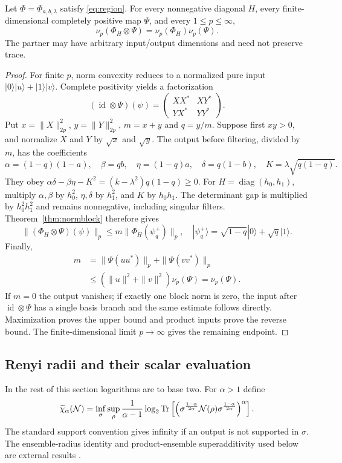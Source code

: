 \begin{theorem}\label{thm:filterednorm}
Let $\Phi=\Phi_{a,b,\lambda}$ satisfy \eqref{eq:region}. For every
nonnegative diagonal $H$, every finite-dimensional completely positive
map $\Psi$, and every $1\le p\le\infty$,
\[
 \nu_p(\Phi_H\otimes\Psi)=\nu_p(\Phi_H)\nu_p(\Psi).
\]
The partner may have arbitrary input/output dimensions and need not
preserve trace.
\end{theorem}
\begin{proof}
For finite $p$, norm convexity reduces to a normalized pure input
$|0\rangle|u\rangle+|1\rangle|v\rangle$. Complete positivity yields a
factorization
\[
 (\operatorname{id}\otimes\Psi)(\psi)
 =\begin{pmatrix}XX^*&XY^*\\YX^*&YY^*\end{pmatrix}.
\]
Put $x=\|X\|_{2p}^2$, $y=\|Y\|_{2p}^2$, $m=x+y$ and $q=y/m$.
Suppose first $xy>0$, and normalize $X$ and $Y$ by $\sqrt{x}$ and
$\sqrt{y}$. The output before filtering, divided by $m$, has the
coefficients
\[
 \alpha=(1-q)(1-a),\quad\beta=qb,\quad
 \eta=(1-q)a,\quad\delta=q(1-b),\quad
 K=\lambda\sqrt{q(1-q)}.
\]
They obey
$\alpha\delta-\beta\eta-K^2=(k-\lambda^2)q(1-q)\ge0$.
For $H=\operatorname{diag}(h_0,h_1)$, multiply $\alpha,\beta$ by
$h_0^2$, $\eta,\delta$ by $h_1^2$, and $K$ by $h_0h_1$.
The determinant gap is multiplied by $h_0^2h_1^2$ and remains
nonnegative, including singular filters. Theorem~\ref{thm:normblock}
therefore gives
\[
 \|(\Phi_H\otimes\Psi)(\psi)\|_p
 \le m\|\Phi_H(\psi_q^+)\|_p,
 \quad |\psi_q^+\rangle=\sqrt{1-q}|0\rangle+\sqrt q|1\rangle.
\]
Finally,
\begin{align*}
 m&=\|\Psi(uu^*)\|_p+\|\Psi(vv^*)\|_p\\
 &\le(\|u\|^2+\|v\|^2)\nu_p(\Psi)=\nu_p(\Psi).
\end{align*}
If $m=0$ the output vanishes; if exactly one block norm is zero,
the input after $\operatorname{id}\otimes\Psi$ has a single basis
branch and the same estimate follows directly. Maximization proves the
upper bound and product inputs prove the reverse bound. The finite-dimensional
limit $p\to\infty$ gives the remaining endpoint.
\end{proof}

\subsection{Renyi radii and their scalar evaluation}
In the rest of this section logarithms are to base two. For $\alpha>1$
define
\[
 \widetilde\chi_\alpha(\mathcal N)=
 \inf_\sigma\sup_\rho\frac1{\alpha-1}
 \log_2\operatorname{Tr}\left[\left(\sigma^{\frac{1-\alpha}{2\alpha}}
 \mathcal N(\rho)\sigma^{\frac{1-\alpha}{2\alpha}}\right)^\alpha\right].
\]
The standard support convention gives infinity if an output is not
supported in $\sigma$. The ensemble-radius identity and product-ensemble
superadditivity used below are external results \cite{mo,beigi}.

